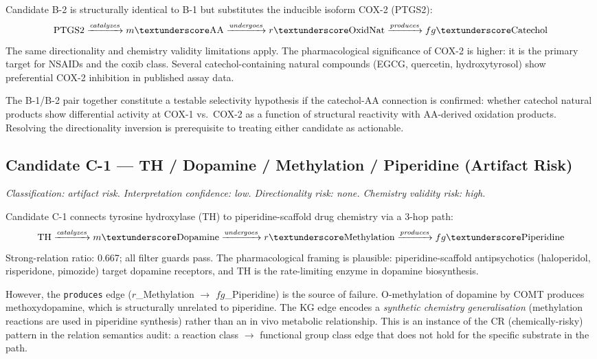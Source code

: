 \smallskip
Candidate B-2 is structurally identical to B-1 but substitutes the inducible
isoform COX-2 (PTGS2):
\[
  \mathrm{PTGS2} \xrightarrow{\textit{catalyzes}}
  m\textunderscore\mathrm{AA} \xrightarrow{\textit{undergoes}}
  r\textunderscore\mathrm{OxidNat} \xrightarrow{\textit{produces}}
  fg\textunderscore\mathrm{Catechol}
\]
The same directionality and chemistry validity limitations apply.
The pharmacological significance of COX-2 is higher: it is the primary target
for NSAIDs and the coxib class.
Several catechol-containing natural compounds (EGCG, quercetin, hydroxytyrosol)
show preferential COX-2 inhibition in published assay data.

The B-1/B-2 pair together constitute a testable selectivity hypothesis if the
catechol-AA connection is confirmed: whether catechol natural products show
differential activity at COX-1 vs.\ COX-2 as a function of structural reactivity
with AA-derived oxidation products.
Resolving the directionality inversion is prerequisite to treating either
candidate as actionable.

\subsection{Candidate C-1 --- TH / Dopamine / Methylation / Piperidine (Artifact Risk)}
\label{cs:c1}

\textit{Classification: artifact risk.
Interpretation confidence: low.
Directionality risk: none. Chemistry validity risk: high.}

\smallskip
Candidate C-1 connects tyrosine hydroxylase (TH) to piperidine-scaffold drug
chemistry via a 3-hop path:
\[
  \mathrm{TH} \xrightarrow{\textit{catalyzes}}
  m\textunderscore\mathrm{Dopamine} \xrightarrow{\textit{undergoes}}
  r\textunderscore\mathrm{Methylation} \xrightarrow{\textit{produces}}
  fg\textunderscore\mathrm{Piperidine}
\]
Strong-relation ratio: 0.667; all filter guards pass.
The pharmacological framing is plausible: piperidine-scaffold antipsychotics
(haloperidol, risperidone, pimozide) target dopamine receptors, and TH is the
rate-limiting enzyme in dopamine biosynthesis.

However, the \texttt{produces} edge
($r$\_Methylation $\to$ $fg$\_Piperidine) is the source of failure.
O-methylation of dopamine by COMT produces methoxydopamine, which is structurally
unrelated to piperidine.
The KG edge encodes a \textit{synthetic chemistry generalisation}
(methylation reactions are used in piperidine synthesis) rather than an in vivo
metabolic relationship.
This is an instance of the CR (chemically-risky) pattern in the relation
semantics audit: a reaction class $\to$ functional group class edge that does
not hold for the specific substrate in the path.

